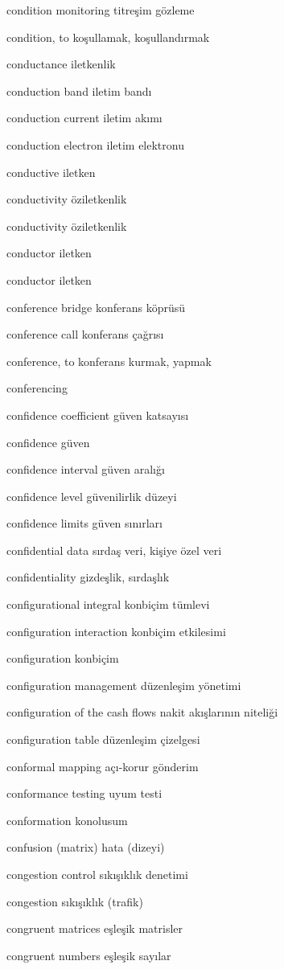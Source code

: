 \documentclass[12pt,fleqn]{article}\usepackage{../../common}
\begin{document}
condition monitoring titreşim gözleme

condition, to koşullamak, koşullandırmak

conductance iletkenlik

conduction band iletim bandı

conduction current iletim akımı

conduction electron iletim elektronu

conductive iletken

conductivity öziletkenlik

conductivity öziletkenlik

conductor iletken

conductor iletken

conference bridge konferans köprüsü

conference call konferans çağrısı

conference, to konferans kurmak, yapmak

conferencing

confidence coefficient güven katsayısı

confidence güven

confidence interval güven aralığı

confidence level güvenilirlik düzeyi

confidence limits güven sınırları

confidential data sırdaş veri, kişiye özel veri

confidentiality gizdeşlik, sırdaşlık

configurational integral konbiçim tümlevi

configuration interaction konbiçim etkilesimi

configuration konbiçim

configuration management düzenleşim yönetimi

configuration of the cash flows nakit akışlarının niteliği

configuration table düzenleşim çizelgesi

conformal mapping açı-korur gönderim

conformance testing uyum testi

conformation konolusum

confusion (matrix) hata (dizeyi)

congestion control sıkışıklık denetimi

congestion sıkışıklık (trafik)

congruent matrices eşleşik matrisler

congruent numbers eşleşik sayılar
\end{document}
